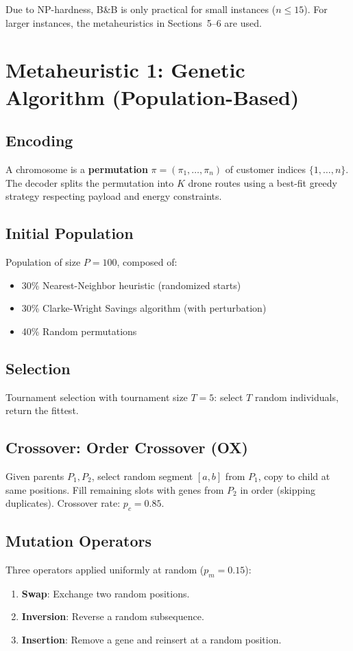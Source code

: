 \documentclass[12pt,a4paper]{article}
\begin{document}
Due to NP-hardness, B\&B is only practical for small instances ($n\leq 15$). For larger instances, the metaheuristics in Sections~5--6 are used.

\section{Metaheuristic 1: Genetic Algorithm (Population-Based)}

\subsection{Encoding}
A chromosome is a \textbf{permutation} $\pi=(\pi_1,\dots,\pi_n)$ of customer indices $\{1,\dots,n\}$. The decoder splits the permutation into $K$ drone routes using a best-fit greedy strategy respecting payload and energy constraints.

\subsection{Initial Population}
Population of size $P=100$, composed of:
\begin{itemize}[nosep]
  \item 30\% Nearest-Neighbor heuristic (randomized starts)
  \item 30\% Clarke-Wright Savings algorithm (with perturbation)
  \item 40\% Random permutations
\end{itemize}

\subsection{Selection}
Tournament selection with tournament size $T=5$: select $T$ random individuals, return the fittest.

\subsection{Crossover: Order Crossover (OX)}
Given parents $P_1,P_2$, select random segment $[a,b]$ from $P_1$, copy to child at same positions. Fill remaining slots with genes from $P_2$ in order (skipping duplicates). Crossover rate: $p_c=0.85$.

\subsection{Mutation Operators}
Three operators applied uniformly at random ($p_m=0.15$):
\begin{enumerate}[nosep]
  \item \textbf{Swap}: Exchange two random positions.
  \item \textbf{Inversion}: Reverse a random subsequence.
  \item \textbf{Insertion}: Remove a gene and reinsert at a random position.
\end{enumerate}
\end{document}
